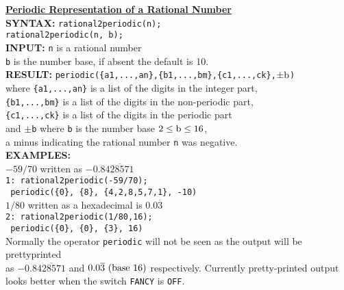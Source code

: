 \documentclass[11pt,a4paper]{article}
\begin{document}
\begin{tabbing}
\textbf{\underline{Periodic Representation of a Rational Number}}\\[\baselineskip]

\textbf{SYNTAX:} \hspace{3mm} 
       \= \texttt{rational2periodic(n);}\\
\> {\tt rational2periodic(n, b);}\\[\baselineskip]

\textbf{INPUT:}  
\> \texttt{n} \hspace{3mm} is a rational number\\
\> {\tt b} \hspace{3mm} is the number base, if absent the default is 10.\\[\baselineskip]

\textbf{RESULT:}
     \> {\tt periodic(\{a1,...,an\},\{b1,...,bm\},\{c1,...,ck\},$\pm{\rm b}$)}\\
 \> where  {\tt\{a1,...,an\}} is a list of the digits in the integer part,\\
 \> {\tt\{b1,...,bm\}} is a list of the digits in the non-periodic part,\\
 \> {\tt\{c1,...,ck\}} is a list of the digits in the periodic part\\
 \> and $\pm${\tt b} where {\tt b} is the number base $2 \leq {\rm b} \leq 16$, \\
 \> a minus indicating the rational number {\tt n} was negative. \\[\baselineskip]

\textbf{EXAMPLES:}\\
    \> $-59/70$ written as $-0.8\overline{428571}$\\
    \>  \texttt{1: rational2periodic(-59/70);}\\
    \> \texttt{ periodic(\{0\}, \{8\}, \{4,2,8,5,7,1\}, -10)}\\[\baselineskip]
    \> $1/80$ written as a hexadecimal is $0.0\overline{3}$\\
    \>  \texttt{2: rational2periodic(1/80,16);}\\
    \> \texttt{ periodic(\{0\}, \{0\}, \{3\}, 16)}\\[\baselineskip]

    Normally the operator {\tt periodic} will not be seen as the output will
    be prettyprinted\\
    as $-0.8\overline{428571}$ and $0.0\overline{3}\ {\rm (base\ 16)}$
    respectively. Currently pretty-printed output \\
    looks better when the switch \texttt{FANCY} is \texttt{OFF}.\\
\end{tabbing}
\end{document}
